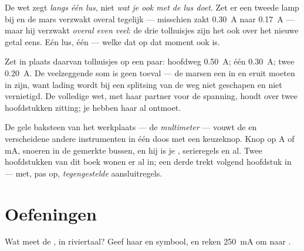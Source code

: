 \begin{example}\label{ex:g8:intensity-ammeter:fineprint}
De wet zegt \emph{langs één lus}, niet \emph{wat je ook met de lus
doet}. Zet er een tweede lamp  bij en de mars verzwakt
overal tegelijk --- misschien zakt \qty{0.30}{A} naar \qty{0.17}{A} ---
maar hij verzwakt \emph{overal even veel}: de drie tolhuisjes zijn het
ook over het nieuwe getal eens. Eén lus, één
 --- welke  dat op dat
moment ook is.
\end{example}

\begin{example}\label{ex:g8:intensity-ammeter:junction}
Zet in plaats daarvan tolhuisjes op een  paar: hoofdweg
\qty{0.50}{A};  één \qty{0.30}{A};  twee
\qty{0.20}{A}. De veelzeggende som is geen toeval --- de marsen een
 in en eruit moeten in  zijn, want lading wordt
bij een splitsing van de weg niet geschapen en niet vernietigd. De
volledige wet, met haar partner voor de spanning, houdt over twee
hoofdstukken zitting; je  hebben haar al ontmoet.
\end{example}

\begin{remark}[De multimeter]\label{rem:g8:intensity-ammeter:multimeter}
De gele baksteen van het werkplaats --- de \emph{multimeter} --- vouwt
de  en verscheidene andere instrumenten in één doos
met een keuzeknop. Knop op \unit{A} of \unit{mA}, snoeren in de
gemerkte bussen, en hij is je , serieregels en al.
Twee hoofdstukken van dit boek wonen er al in; een derde trekt volgend
hoofdstuk in --- met, pas op, \emph{tegengestelde} aansluitregels.
\end{remark}

\section{Oefeningen}

\begin{exercise}[$\star$]\label{exo:g8:intensity-ammeter:1}
Wat meet de , in riviertaal? Geef haar
 en symbool, en reken \qty{250}{mA} om naar
.
\end{exercise}

